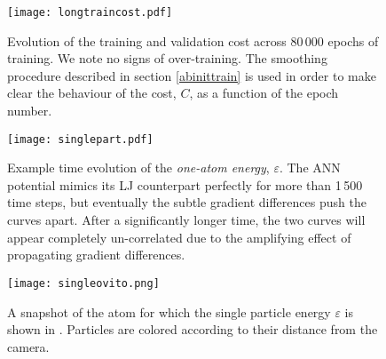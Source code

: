 \documentclass[../../master.tex]{subfiles}
\begin{document}
\begin{SCfigure}
\centering
\texttt{[image: longtraincost.pdf]}
\caption{Evolution of the training and validation cost across 80\,000 epochs of training. We note no signs of over-training. The smoothing procedure described in section \ref{abinittrain} is used in order to make clear the behaviour of the cost, $C$, as a function of the epoch number. \label{fig:longtrainmeta}}
\end{SCfigure}
\begin{figure}
\centering
\texttt{[image: singlepart.pdf]}
\caption{Example time evolution of the \emph{one-atom energy}, $\varepsilon$. The ANN potential mimics its LJ counterpart perfectly for more than 1\,500 time steps, but eventually the subtle gradient differences push the curves apart. After a significantly longer time, the two curves will appear completely un-correlated due to the amplifying effect of propagating gradient differences.  \label{fig:singlepart}}
\end{figure}


\begin{figure}
\centering
\texttt{[image: singleovito.png]}
\caption{A snapshot of the atom for which the single particle energy $\varepsilon$ is shown in . Particles are colored according to their distance from the camera.   \label{fig:singleovito}}
\end{figure}
\end{document}
